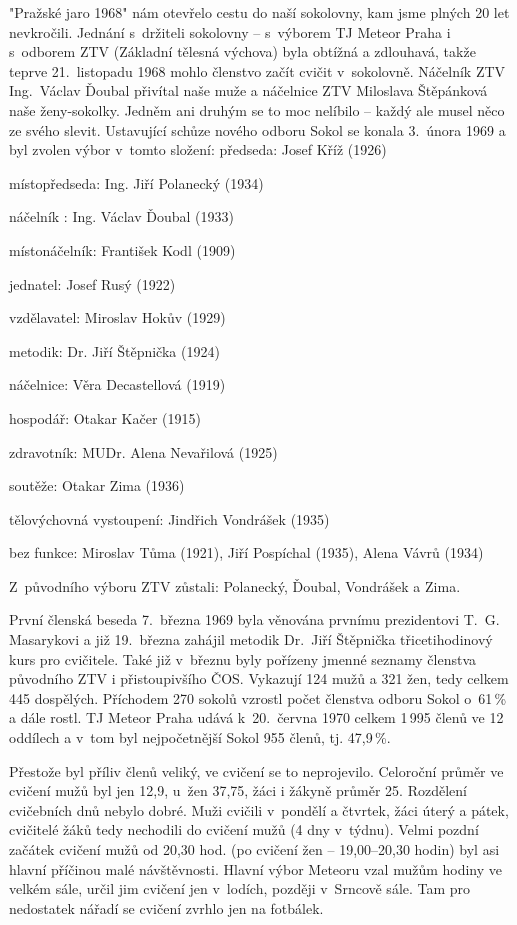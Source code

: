 \documentclass[a5paper, 11pt, twoside]{article}
\begin{document}
"Pražské jaro 1968" nám otevřelo cestu do naší sokolovny, kam jsme
plných 20 let nevkročili. Jednání s~držiteli sokolovny -- s~výborem TJ
Meteor Praha i s~odborem ZTV (Základní tělesná výchova) byla obtížná a
zdlouhavá, takže teprve 21.~listopadu 1968 mohlo členstvo začít cvičit
v~sokolovně. Náčelník ZTV Ing.~Václav Ďoubal přivítal naše muže a
náčelnice ZTV Miloslava Štěpánková naše ženy-sokolky. Jedněm ani druhým
se to moc nelíbilo -- každý ale musel něco ze svého slevit. Ustavující
schůze nového odboru Sokol se konala 3.~února 1969 a byl zvolen výbor
v~tomto složení:
\medskip
předseda: Josef Kříž (1926)

místopředseda: Ing. Jiří Polanecký (1934)

náčelník : Ing. Václav Ďoubal (1933)

místonáčelník: František Kodl (1909)

jednatel: Josef Rusý (1922)

vzdělavatel: Miroslav Hokův (1929)

metodik: Dr. Jiří Štěpnička (1924)

náčelnice: Věra Decastellová (1919)

hospodář: Otakar Kačer (1915)

zdravotník: MUDr. Alena Nevařilová (1925)

soutěže: Otakar Zima (1936)

tělovýchovná vystoupení: Jindřich Vondrášek (1935)

bez funkce: Miroslav Tůma (1921), Jiří Pospíchal (1935), Alena Vávrů (1934)

Z~původního výboru ZTV zůstali: Polanecký, Ďoubal, Vondrášek a Zima.

\medskip

První členská beseda 7.~března 1969 byla věnována prvnímu prezidentovi
T.~G. Masarykovi a již 19.~března zahájil metodik Dr.~Jiří Štěpnička
třicetihodinový kurs pro cvičitele. Také již v~březnu byly pořízeny
jmenné seznamy členstva původního ZTV i přistoupivšího ČOS. Vykazují 124
mužů a 321 žen, tedy celkem 445 dospělých. Příchodem 270 sokolů vzrostl
počet členstva odboru Sokol o~61\,\% a dále rostl. TJ Meteor Praha udává
k~20.~června 1970 celkem 1\,995 členů ve 12 oddílech a v~tom byl
nejpočetnější Sokol 955 členů, tj. 47,9\,\%.

Přestože byl příliv členů veliký, ve cvičení se to neprojevilo.
Celoroční průměr ve cvičení mužů byl jen 12,9, u~žen 37,75, žáci i
žákyně průměr 25. Rozdělení cvičebních dnů nebylo dobré. Muži cvičili
v~pondělí a čtvrtek, žáci úterý a pátek, cvičitelé žáků tedy nechodili do
cvičení mužů (4 dny v~týdnu). Velmi pozdní začátek cvičení mužů od 20,30
hod. (po cvičení žen --⁠⁠⁠⁠⁠⁠ 19,00--⁠⁠⁠⁠⁠⁠20,30 hodin) byl asi hlavní příčinou malé
návštěvnosti. Hlavní výbor Meteoru vzal mužům hodiny ve velkém sále,
určil jim cvičení jen v~lodích, později v~Srncově sále. Tam pro
nedostatek nářadí se cvičení zvrhlo jen na fotbálek.
\end{document}
